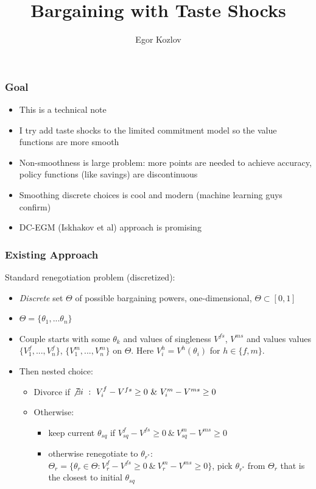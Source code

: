 \documentclass[aspectratio=169]{beamer}
\title{Bargaining with Taste Shocks}
\author{Egor Kozlov}
\institute{
  Department of Economics\\
  Northwestern University}
\let\olditem\item
\renewcommand{\item}{%
\olditem\vspace{\fill}}
\begin{document}
\begin{frame}[plain]
\addtocounter{framenumber}{-1}
\date{\scriptsize}
\titlepage
\end{frame}


\begin{frame}
\frametitle{Goal}
\begin{itemize}
\item This is a technical note
\item I try add taste shocks to the limited commitment model so the value functions are more smooth
\item Non-smoothness is large problem: more points are needed to achieve accuracy, policy functions (like savings) are discontinuous
\item Smoothing discrete choices is cool and modern (machine learning guys confirm)
\item DC-EGM (Iskhakov et al) approach is promising
\end{itemize}
\end{frame}


\begin{frame}
\frametitle{Existing Approach}
Standard renegotiation problem (discretized):
\begin{itemize}
\item \textit{Discrete} set $\Theta$ of possible bargaining powers, one-dimensional, $\Theta \subset [0,1]$
\item $\Theta = \{\theta_1,...\theta_n\}$
\item Couple starts with some $\theta_k$ and values of singleness $V^{fs}$, $V^{ms}$ and values values $\{V^f_1,...,V^f_n\}$, $\{V^m_1,...,V^m_n\}$ on $\Theta$. Here $V_i^{h} = V^h(\theta_i)$ for $h \in \{f,m\}$.
\item Then nested choice:
\begin{itemize}
\item Divorce if $\not\exists i \ : \ V^f_i - V^{fs}  \geq 0\ \& \ V^m_i - V^{ms} \geq 0$
\item Otherwise: 
\begin{itemize}
\item keep current $\theta_{sq}$ if $V^f_{sq} - V^{fs} \geq 0\ \& \ V^m_{sq} - V^{ms} \geq 0$
\item otherwise renegotiate to $\theta_{r^*}$: $\Theta_r = \{\theta_r \in \Theta: V^f_r - V^{fs} \geq 0\ \& \ V^m_r - V^{ms} \geq 0\}$, pick $\theta_{r^*}$ from $\Theta_r$ that is the closest to initial $\theta_{sq}$
\end{itemize}
\end{itemize}
\end{itemize}
\end{frame}
\end{document}
